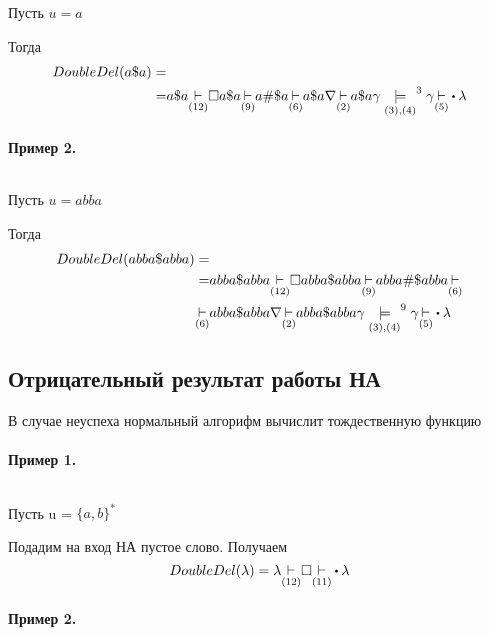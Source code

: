 Пусть  $u = a$

Тогда
\begin{align*}
    DoubleDel(a\$a) = &\\
    = & a\$a \underset{(12)}{\step} \square a\$a 
                      \underset{(9)}{\step} a\#\$a \underset{(6)}{\step} a\$ a\nabla
    \underset{(2)}{\step} a\$a\gamma \underset{(3),(4)}{\models}^{3} \gamma 
    \underset{(5)}{\step}\bigcdot \lambda
\end{align*}


\paragraph*{Пример 2.} ${}$\newline

Пусть $u = abba$

Тогда
\begin{align*}
    DoubleDel(abba\$abba) = &\\
    = & abba\$abba \underset{(12)}{\step} \square abba\$abba \underset{(9)}{\step} abba\#\$abba
    \underset{(6)}{\step}\\
    \underset{(6)}{\step} & abba\$ abba\nabla \underset{(2)}{\step} abba\$abba\gamma
    \underset{(3),(4)}{\models}^{9} \gamma \underset{(5)}{\step}\bigcdot \lambda
\end{align*}

\subsection{Отрицательный результат работы НА}

В случае неуспеха нормальный алгорифм вычислит тождественную функцию

\paragraph*{Пример 1.} ${}$ \newline

Пусть u =  $\{a,b\}^{*}$ 

Подадим на вход НА пустое слово. Получаем
\[
    DoubleDel(\lambda) = \lambda \underset{(12)}{\step}
    \square \underset{(11)}{\step}\bigcdot \lambda
\] 

\paragraph*{Пример 2.} ${}$ \newline


